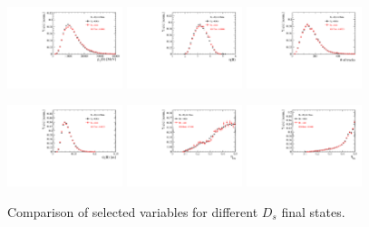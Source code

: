 \begin{figure}[h]
\centering
\includegraphics[height=!,width=0.3\textwidth]{figs/dataVsMC/finalState_norm/Ds2all_Bs_PT.pdf}
\includegraphics[height=!,width=0.3\textwidth]{figs/dataVsMC/finalState_norm/Ds2all_Bs_ETA.pdf}
\includegraphics[height=!,width=0.3\textwidth]{figs/dataVsMC/finalState_norm/Ds2all_NTracks.pdf}


\includegraphics[height=!,width=0.3\textwidth]{figs/dataVsMC/finalState_norm/Ds2all_Bs_DTF_TAUERR.pdf}
\includegraphics[height=!,width=0.3\textwidth]{figs/dataVsMC/finalState_norm/Ds2all_Bs_TAGOMEGA_OS.pdf}
\includegraphics[height=!,width=0.3\textwidth]{figs/dataVsMC/finalState_norm/Ds2all_Bs_SS_nnetKaon_PROB.pdf}


\caption{Comparison of selected variables for different $D_s$ final states.}
\label{fig:}
\end{figure}

